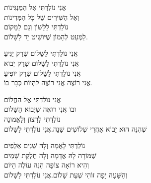 \documentclass[11pt,twoside]{article}
\begin{document}
{{אֲנִי נוֹלַדְתִּי אֶל הַמַּנְגִּינוֹת\\
וְאֶל הַשִּׁירִים שֶׁל כָּל הַמְּדִינוֹת\\
נוֹלַדְתִּי לַלָּשׁוֹן וְגַם לַמָּקוֹם\\
לַמְּעַט לְהָמוֹן שֶׁיּוֹשִׁיט יָד לַשָּׁלוֹם.

{\large%
אֲנִי נוֹלַדְתִּי לַשָּׁלוֹם שֶׁרַק יַגִּיעַ\\
אֲנִי נוֹלַדְתִּי לַשָּׁלוֹם שֶׁרַק יְבוֹא\\
אֲנִי נוֹלַדְתִּי לַשָּׁלוֹם שֶׁרַק יוֹפִיעַ\\
אֲנִי רוֹצֶה אֲנִי רוֹצֶה לִהְיוֹת כְּבָר בּוֹ.
}

אֲנִי נוֹלַדְתִּי אֶל הַחֲלוֹם\\
וּבוֹ אֲנִי רוֹאֶה שֶׁיְּבוֹא הַשָּׁלוֹם\\
נוֹלַדְתִּי לָרָצוֹן וְלָאֱמוּנָה\\
שֶׁהִנֵּה הוּא יָבוֹא אַחֲרֵי שְׁלוֹשִׁים שָׁנָה.\hfill{\scriptsize אֲנִי נוֹלַדְתִּי לַשָּׁלוֹם}

נוֹלַדְתִּי לָאֻמָּה וְלָהּ שָׁנִים אַלְפַּיִם\\
שֶׁמּוֹרָה לָהּ אֲדָמָה וְלָהּ חֶלְקַת שָׁמַיִם\\
וְהִיא רוֹאָה צוֹפָה הִנֵּה עוֹלֶה הַיּוֹם\\
וְהַשָּׁעָה יָפָה זוֹהִי שְׁעַת שָׁלוֹם.\hfill{\scriptsize אֲנִי נוֹלַדְתִּי לַשָּׁלוֹם}

\newpage

}}
\end{document}
